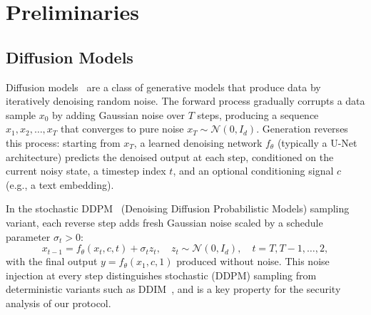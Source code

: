 \section{Preliminaries}
\label{sec:preliminaries}

\subsection{Diffusion Models}
\label{subsec:diffusion-models}

Diffusion models~\cite{ho2020ddpm} are a class of generative models that produce data by iteratively denoising random noise. The forward process gradually corrupts a data sample $x_0$ by adding Gaussian noise over $T$ steps, producing a sequence $x_1, x_2, \ldots, x_T$ that converges to pure noise $x_T \sim \mathcal{N}(0, I_d)$. Generation reverses this process: starting from $x_T$, a learned denoising network $f_\theta$ (typically a U-Net architecture) predicts the denoised output at each step, conditioned on the current noisy state, a timestep index $t$, and an optional conditioning signal $c$ (e.g., a text embedding).

In the stochastic DDPM~\cite{ho2020ddpm} (Denoising Diffusion Probabilistic Models) sampling variant, each reverse step adds fresh Gaussian noise scaled by a schedule parameter $\sigma_t > 0$:
\begin{equation}
\label{eq:ddpm-step-prelim}
    x_{t-1} = f_\theta(x_t, c, t) + \sigma_t z_t, \quad z_t \sim \mathcal{N}(0, I_d), \quad t = T, T{-}1, \ldots, 2,
\end{equation}
with the final output $y = f_\theta(x_1, c, 1)$ produced without noise. This noise injection at every step distinguishes stochastic (DDPM) sampling from deterministic variants such as DDIM~\cite{song2021ddim}, and is a key property for the security analysis of our protocol.

